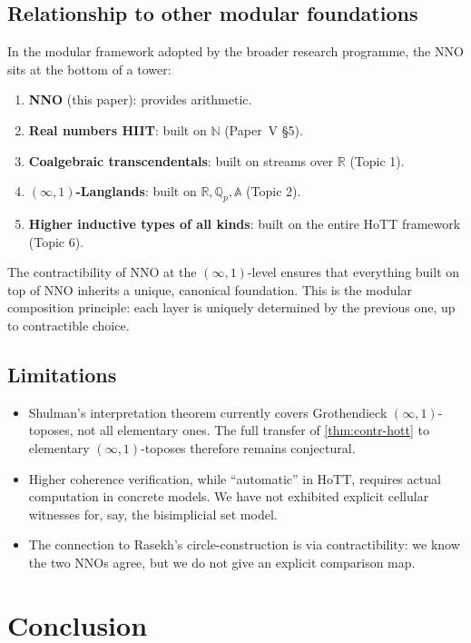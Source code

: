 \documentclass[12pt]{article}
\theoremstyle{definition}
\theoremstyle{remark}
\newcommand{\N}{\mathbb{N}}
\newcommand{\Q}{\mathbb{Q}}
\newcommand{\R}{\mathbb{R}}
\begin{document}
\subsection{Relationship to other modular foundations}

In the modular framework adopted by the broader research programme, the NNO sits at the bottom of a tower:
\begin{enumerate}
  \item \textbf{NNO} (this paper): provides arithmetic.
  \item \textbf{Real numbers HIIT}: built on $\N$ (Paper~V \S5).
  \item \textbf{Coalgebraic transcendentals}: built on streams over $\R$ (Topic 1).
  \item \textbf{$(\infty,1)$-Langlands}: built on $\R, \Q_{p}, \mathbb{A}$ (Topic 2).
  \item \textbf{Higher inductive types of all kinds}: built on the entire HoTT framework (Topic 6).
\end{enumerate}
The contractibility of NNO at the $(\infty,1)$-level ensures that everything built on top of NNO inherits a unique, canonical foundation. This is the modular composition principle: each layer is uniquely determined by the previous one, up to contractible choice.

\subsection{Limitations}

\begin{itemize}
  \item Shulman's interpretation theorem currently covers Grothendieck $(\infty,1)$-toposes, not all elementary ones. The full transfer of \cref{thm:contr-hott} to elementary $(\infty,1)$-toposes therefore remains conjectural.
  \item Higher coherence verification, while ``automatic'' in HoTT, requires actual computation in concrete models. We have not exhibited explicit cellular witnesses for, say, the bisimplicial set model.
  \item The connection to Rasekh's circle-construction is via contractibility: we know the two NNOs agree, but we do not give an explicit comparison map.
\end{itemize}

\section{Conclusion}
\end{document}
